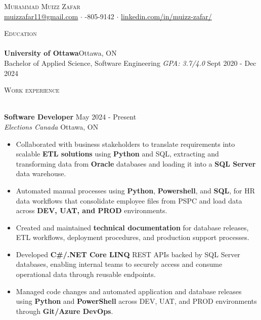 \documentclass[a4paper]{article}
\newcommand{\lineunder} {
    \vspace*{-8pt} \\
    \hspace*{-18pt} \hrulefill \\
}
\newcommand{\header} [1] {
    {\hspace*{-18pt}\vspace*{6pt} \textsc{#1}}
    \vspace*{-6pt} \lineunder
}
\begin{document}
\vspace*{-40pt}

    

\vspace*{-10pt}
\begin{center}
	{\Huge \scshape {Muhammad Muizz Zafar}}\\
	\faSend \space \href{mailto:muizzafar11@gmail.com}{muizzafar11@gmail.com} $\cdot$ \faPhoneSquare {}-805-9142 $\cdot$ \faLinkedinSquare \space \href{https://www.linkedin.com/in/muizz-zafar/}{linkedin.com/in/muizz-zafar/} 
	\\
\end{center}


\header{Education}
\textbf{University of Ottawa}\hfill Ottawa, ON\\
Bachelor of Applied Science, Software Engineering \textit{GPA: 3.7/4.0} \hfill Sept 2020 - Dec 2024\\
\vspace{2mm}

\header{Work experience}
\vspace{1.5mm}


\textbf{Software Developer} \hfill May 2024 - Present\\
\textit{Elections Canada} \hfill Ottawa, ON\\
\vspace{-2mm}
\begin{itemize} \itemsep -2pt
    
    \item Collaborated with business stakeholders to translate requirements into scalable \textbf{ETL solutions} using \textbf{Python} and SQL, extracting and transforming data from \textbf{Oracle} databases and loading it into a \textbf{SQL Server} data warehouse.
    
    \item Automated manual processes using \textbf{Python}, \textbf{Powershell}, and \textbf{SQL}, for HR data workflows that consolidate employee files from PSPC and load data across \textbf{DEV, UAT, and PROD} environments.
    
    \item Created and maintained \textbf{technical documentation} for database releases, ETL workflows, deployment procedures, and production support processes.

    \item Developed \textbf{C\#/.NET Core LINQ} REST APIs backed by SQL Server databases, enabling internal teams to securely access and consume operational data through reusable endpoints.
    
    \item Managed code changes and automated application and database releases using \textbf{Python} and \textbf{PowerShell} across DEV, UAT, and PROD environments through \textbf{Git/Azure DevOps}.

\end{itemize}
\end{document}
